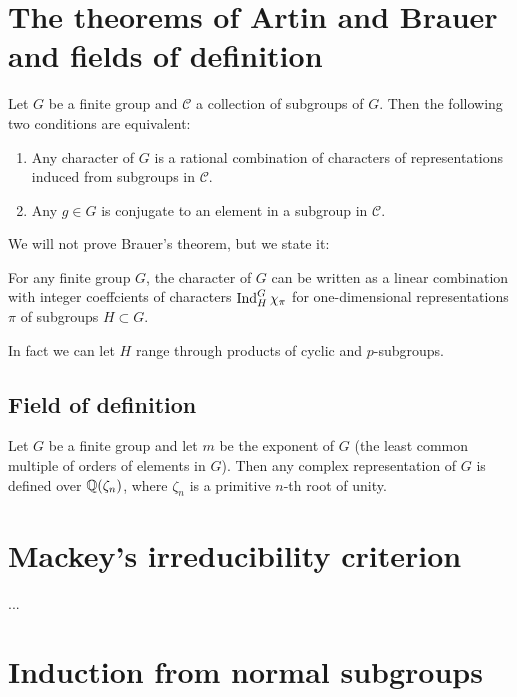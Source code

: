 \documentclass[11pt, english]{article}
\begin{document}
\section{The theorems of Artin and Brauer and fields of definition}

\begin{thm}[Artin]

Let $G$ be a finite group and $\mathscr C$ a collection of subgroups of $G$. Then the following two conditions are equivalent:
\begin{enumerate}
\item Any character of $G$ is a rational combination of characters of representations induced from subgroups in $\mathscr C$.
\item Any $g \in G$ is conjugate to an element in a subgroup in $\mathscr C$.
\end{enumerate}
\end{thm}


We will not prove Brauer's theorem, but we state it:
\begin{thm}[Brauer]
  For any finite group $G$, the character of $G$ can be written as a linear combination with integer coeffcients of characters $\operatorname{Ind}_H^G \chi_\pi$ for one-dimensional representations $\pi$ of subgroups $H \subset G$.

In fact we can let $H$ range through products of cyclic and $p$-subgroups.
\end{thm}

\subsection{Field of definition}

\begin{thm}[Brauer]
Let $G$ be a finite group and let $m$ be the exponent of $G$ (the least common multiple of orders of elements in $G$). Then any complex representation of $G$ is defined over $\mathbb{Q}(\zeta_n)$, where $\zeta_n$ is a primitive $n$-th root of unity.
  
\end{thm}

\section{Mackey's irreducibility criterion}

...

\section{Induction from normal subgroups}
\end{document}
